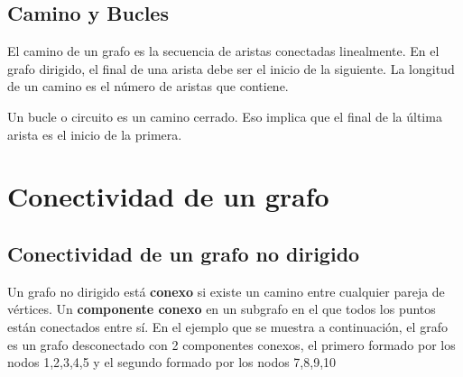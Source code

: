 \documentclass[11pt]{article}
\theoremstyle{plain}
\begin{document}
        \subsection{Camino y Bucles} %
        \label{sub:camino_y_bucles}
            El camino de un grafo es la secuencia de aristas conectadas linealmente. En el grafo dirigido, el final de una arista debe ser el inicio de la siguiente. La longitud de un camino es el número de aristas que contiene. 

            Un bucle o circuito es un camino cerrado. Eso implica que el final de la última arista es el inicio de la primera.
    \section{Conectividad de un grafo} %
    \label{sec:conectividad_de_un_grafo}
        \subsection{Conectividad de un grafo no dirigido} %
        \label{sub:conectividad_de_un_grafo_no_dirigido}
            Un grafo no dirigido está \textbf{conexo} si existe un camino entre cualquier pareja de vértices. Un \textbf{componente conexo} en un subgrafo en el que todos los puntos están conectados entre sí. En el ejemplo que se muestra a continuación, el grafo es un grafo desconectado con 2 componentes conexos, el primero formado por los nodos 1,2,3,4,5 y el segundo formado por los nodos 7,8,9,10\\
            \begin{center}
            \end{center}
            
\end{document}
